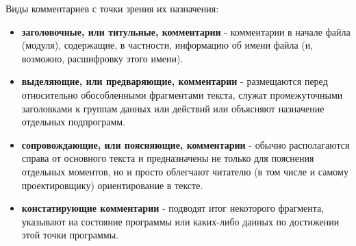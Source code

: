 \documentclass{beamer}
\begin{document}
\begin{frame}
Виды комментариев с точки зрения их назначения:
\begin{itemize}
\item \textbf{заголовочные, или титульные, комментарии} - комментарии в
начале файла (модуля), содержащие, в частности, информацию об
имени файла (и, возможно, расшифровку этого имени).
\item \textbf{выделяющие, или предваряющие, комментарии} -
размещаются перед относительно обособленными фрагментами
текста, служат промежуточными заголовками к группам данных
или действий или объясняют назначение отдельных подпрограмм.
\item \textbf{сопровождающие, или поясняющие, комментарии} - обычно
располагаются справа от основного текста и предназначены не
только для пояснения отдельных моментов, но и просто облегчают
читателю (в том числе и самому проектировщику) ориентирование
в тексте.
\item \textbf{констатирующие комментарии} - подводят итог некоторого
фрагмента, указывают на состояние программы или каких-либо
данных по достижении этой точки программы.
\end{itemize}
\end{frame}
\end{document}
